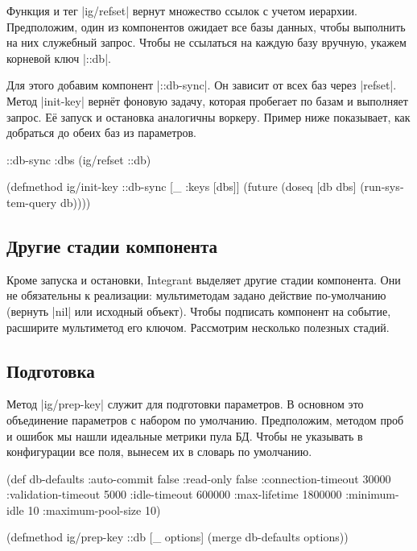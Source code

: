 Функция и тег \spverb|ig/refset| вернут множество ссылок с учетом
иерархии. Предположим, один из компонентов ожидает все базы данных, чтобы
выполнить на них служебный запрос. Чтобы не ссылаться на каждую базу вручную,
укажем корневой ключ \spverb|::db|.

Для этого добавим компонент \spverb|::db-sync|. Он зависит от всех баз через
\spverb|refset|. Метод \spverb|init-key| верн\"{е}т фоновую задачу, которая
пробегает по базам и выполняет запрос. Е\"{е} запуск и остановка аналогичны
воркеру. Пример ниже показывает, как добраться до обеих баз из параметров.

\begin{english}
  \begin{clojure}
{::db-sync {:dbs (ig/refset ::db)}}

(defmethod ig/init-key ::db-sync
  [_ {:keys [dbs]}]
  (future
    (doseq [db dbs]
      (run-system-query db))))
  \end{clojure}
\end{english}

\subsection{Другие стадии компонента}

Кроме запуска и остановки, Integrant выделяет другие стадии компонента. Они не
обязательны к реализации: мультиметодам задано действие по-умолчанию (вернуть
\spverb|nil| или исходный объект). Чтобы подписать компонент на событие,
расширите мультиметод его ключом. Рассмотрим несколько полезных стадий.

\subsection{Подготовка}

Метод \spverb|ig/prep-key| служит для подготовки параметров. В основном это
объединение параметров с набором по умолчанию. Предположим, методом проб и
ошибок мы нашли идеальные метрики пула БД. Чтобы не указывать в конфигурации все
поля, вынесем их в словарь по умолчанию.

\begin{english}
  \begin{clojure}
(def db-defaults
  {:auto-commit        false
   :read-only          false
   :connection-timeout 30000
   :validation-timeout 5000
   :idle-timeout       600000
   :max-lifetime       1800000
   :minimum-idle       10
   :maximum-pool-size  10})

(defmethod ig/prep-key ::db
  [_ options]
  (merge db-defaults options))
  \end{clojure}
\end{english}

